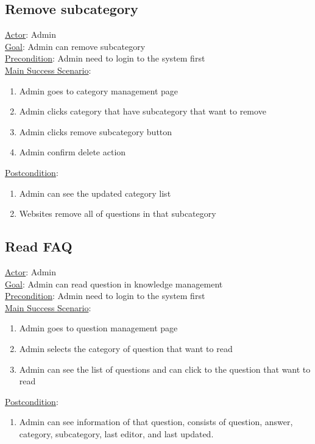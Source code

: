 \documentclass[12pt,oneside,openright,a4paper]{cpe-english-project}
\begin{document}
\subsection{Remove subcategory}
\underline{Actor}: Admin\\
\underline{Goal}: Admin can remove subcategory\\
\underline{Precondition}: Admin need to login to the system first\\
\underline{Main Success Scenario}:
\begin{enumerate}[label={\arabic*.}]
	\item Admin goes to category management page
	\item Admin clicks category that have subcategory that want to remove
	\item Admin clicks remove subcategory button
	\item Admin confirm delete action
\end{enumerate}
\underline{Postcondition}: 
\begin{enumerate}[label={\arabic*.}]
	\item Admin can see the updated category list
	\item Websites remove all of questions in that subcategory
\end{enumerate}

\subsection{Read FAQ}
\underline{Actor}: Admin\\
\underline{Goal}: Admin can read question in knowledge management\\
\underline{Precondition}: Admin need to login to the system first\\
\underline{Main Success Scenario}:
\begin{enumerate}[label={\arabic*.}]
	\item Admin goes to question management page
	\item Admin selects the category of question that want to read
	\item Admin can see the list of questions and can click to the question that want to read
\end{enumerate}
\underline{Postcondition}: 
\begin{enumerate}[label={\arabic*.}]
	\item Admin can see information of that question, consists of question, answer, category, subcategory, last editor, and last updated.
\end{enumerate}
\end{document}
